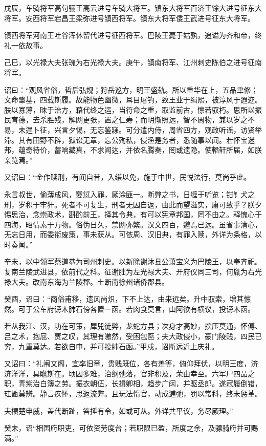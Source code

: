 \documentclass[12pt,UTF8]{ctexbook}
\begin{document}
戊辰，车骑将军高句骊王高云进号车骑大将军。镇东大将军百济王馀大进号征东大将军。安西将军宕昌王梁弥进号镇西将军。镇东大将军倭王武进号征东大将军。

镇西将军河南王吐谷浑休留代进号征西将军。巴陵王薨于姑孰，追谥为齐和帝，终礼一依故事。

己巳，以光禄大夫张瑰为右光禄大夫。庚午，镇南将军、江州刺史陈伯之进号征南将军。

诏曰：“观风省俗，哲后弘规；狩岳巡方，明王盛轨。所以重华在上，五品聿修；文命肇基，四载斯履。故能物色幽微，耳目屠钓，致王业于缉熙，被淳风于遐迩。朕以寡薄，昧于治方，藉代终之运，当符命之重，取监前古，懔若驭朽。思所以振民育德，去杀胜残，解网更张，置之仁寿；而明惭照远，智不周物，兼以岁之不易，未遑卜征，兴言夕惕，无忘鉴寐。可分遣内侍，周省四方，观政听谣，访贤举滞。其有田野不辟，狱讼无章，忘公殉私，侵渔是务者，悉随事以闻。若怀宝迷邦，蕴奇待价，蓄响藏真，不求闻达，并依名腾奏，罔或遗隐。使輶轩所届，如朕亲览焉。”

又诏曰：“金作赎刑，有闻自昔，入缣以免，施于中世，民悦法行，莫尚乎此。

永言叔世，偷薄成风，婴愆入罪，厥涂匪一。断弊之书，日缠于听览；钳钅犬之刑，岁积于牢犴。死者不可复生，刑者无因自返，由此而望滋实，庸可致乎？朕夕惕思治，念崇政术，斟酌前王，择其令典，有可以宪章邦国，罔不由之。释愧心于四海，昭情素于万物。俗伪日久，禁网弥繁。汉文四百，邈焉已远。虽省事清心，无忘日用，而委衔废策，事未获从。可依周、汉旧典，有罪入赎，外详为条格，以时奏闻。”

辛未，以中领军蔡道恭为司州刺史。以新除谢沐县公萧宝义为巴陵王，以奉齐祀。复南兰陵武进县，依前代之科。征谢朏为左光禄大夫、开府仪同三司，何胤为右光禄大夫。改南东海为兰陵郡。土断南徐州诸侨郡县。

癸酉，诏曰：“商俗甫移，遗风尚炽，下不上达，由来远矣。升中驭索，增其懔然。可于公车府谤木肺石傍各置一函。若肉食莫言，山阿欲有横议，投谤木函。

若从我江、汉，功在可策，犀兕徒弊，龙蛇方县；次身才高妙，摈压莫通，怀傅、吕之术，抱屈、贾之叹，其理有皦然，受困包匦；夫大政侵小，豪门陵贱，四民已穷，九重莫达。若欲自申，并可投肺石函。”甲戍，诏断远近上庆礼。

又诏曰：“礼闱文阁，宜率旧章，贵贱既位，各有差等，俯仰拜伏，以明王度，济济洋洋，具瞻斯在。顷因多难，治纲弛落，官非积及，荣由幸至。六军尸四品之职，青紫治白簿之劳。振衣朝伍，长揖卿相，趋步广闼，并驱丞郎。遂冠履倒错，珪甑莫辨。静言疚怀，思返流弊。且玩法惰官，动成逋弛，罚以常科，终未惩革。

夫槚楚申威，盖代断趾，笞捶有令，如或可从。外详共平议，务尽厥理。”

癸未，诏“相国府职吏，可依资劳度台；若职限已盈，所度之余，及骠骑府并可赐满。”
\end{document}

